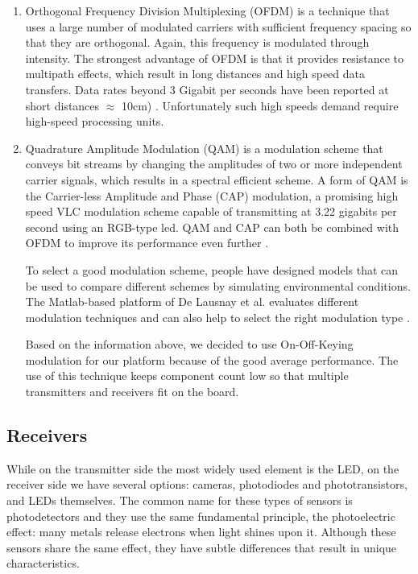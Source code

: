 \begin{enumerate}
\item Orthogonal Frequency Division Multiplexing (OFDM) is a technique that
uses a large number of modulated carriers with sufficient frequency spacing
so that they are orthogonal. Again, this frequency is modulated through intensity.
The strongest advantage of OFDM is that it provides resistance to
multipath effects, which result in long distances and high speed data transfers.
Data rates beyond 3 Gigabit per seconds have been reported at short
distances $\approx$ 10cm) \citep{modulationStandard}. Unfortunately such high speeds demand require
high-speed processing units.

\item  Quadrature Amplitude Modulation (QAM) is a modulation scheme that conveys
bit streams by changing the amplitudes of two or more independent
carrier signals, which results in a spectral efficient scheme. A form of
QAM is the Carrier-less Amplitude and Phase (CAP) modulation, a promising
high speed VLC modulation scheme capable of transmitting at 3.22
gigabits per second using an RGB-type led. QAM and CAP can both
be combined with OFDM to improve its performance even further \citep{ofdm-cap}.

To select a good modulation scheme, people have designed models that can
be used to compare different schemes by simulating environmental conditions.
The Matlab-based platform of De Lausnay et al. evaluates different modulation
techniques and can also help to select the right modulation type \citep{matlab}.

Based on the information above, we decided to use On-Off-Keying modulation
for our platform because of the good average performance. The use of this technique keeps component count low so that multiple transmitters and receivers fit on the board.

\end{enumerate}

\subsection{Receivers}

While on the transmitter side the most widely used element is the LED, on the
receiver side we have several options: cameras, photodiodes and phototransistors,
and LEDs themselves. The common name for these types of sensors is
photodetectors and they use the same fundamental principle, the photoelectric
effect: many metals release electrons when light shines upon it. Although these
sensors share the same effect, they have subtle differences that result in unique
characteristics.

